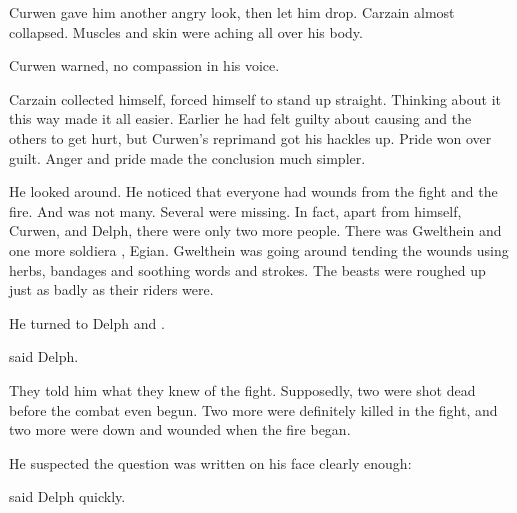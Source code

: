 
Curwen gave him another angry look, then let him drop. 
Carzain almost collapsed. 
Muscles and skin were aching all over his body. 

 Curwen warned, no compassion in his voice. 

Carzain collected himself, forced himself to stand up straight. 
Thinking about it this way made it all easier. 
Earlier he had felt guilty about causing \Tsekkect{} and the others to get hurt, but Curwen's reprimand got his hackles up. 
Pride won over guilt. 
Anger and pride made the conclusion much simpler.  
  
He looked around. 
He noticed that everyone had wounds from the fight and the fire. 
And  was not many. 
Several were missing. 
In fact, apart from himself, Curwen, \Tsekkect{} and Delph, there were only two more people. 
There was Gwelthein and one more soldier\dash a \sphyle, Egian. 
Gwelthein was going around tending the \pps{\relcs} wounds using herbs, bandages and soothing words and strokes. 
The beasts were roughed up just as badly as their riders were. 


He turned to Delph and \Tsekkect{}. 

 said Delph. 

They told him what they knew of the fight. 
Supposedly, two were shot dead before the combat even begun. 
Two more were definitely killed in the fight, and two more were down and wounded when the fire began. 

He suspected the question was written on his face clearly enough: 

 said Delph quickly. 

